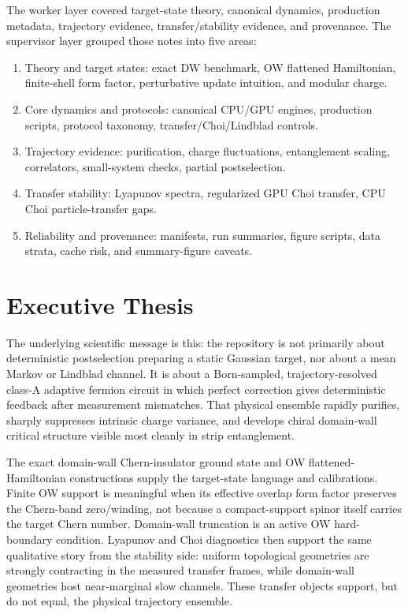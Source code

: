 \documentclass[aps,prb,onecolumn,nofootinbib,superscriptaddress]{revtex4-2}
\begin{document}
The worker layer covered target-state theory, canonical dynamics, production metadata, trajectory evidence, transfer/stability evidence, and provenance.  The supervisor layer grouped those notes into five areas:
\begin{enumerate}
\item Theory and target states: exact DW benchmark, OW flattened Hamiltonian, finite-shell form factor, perturbative update intuition, and modular charge.
\item Core dynamics and protocols: canonical CPU/GPU engines, production scripts, protocol taxonomy, transfer/Choi/Lindblad controls.
\item Trajectory evidence: purification, charge fluctuations, entanglement scaling, correlators, small-system checks, partial postselection.
\item Transfer stability: Lyapunov spectra, regularized GPU Choi transfer, CPU Choi particle-transfer gaps.
\item Reliability and provenance: manifests, run summaries, figure scripts, data strata, cache risk, and summary-figure caveats.
\end{enumerate}

\section{Executive Thesis}

The underlying scientific message is this: the repository is not primarily about deterministic postselection preparing a static Gaussian target, nor about a mean Markov or Lindblad channel.  It is about a Born-sampled, trajectory-resolved class-A adaptive fermion circuit in which perfect correction gives deterministic feedback after measurement mismatches.  That physical ensemble rapidly purifies, sharply suppresses intrinsic charge variance, and develops chiral domain-wall critical structure visible most cleanly in strip entanglement.

The exact domain-wall Chern-insulator ground state and OW flattened-Hamiltonian constructions supply the target-state language and calibrations.  Finite OW support is meaningful when its effective overlap form factor preserves the Chern-band zero/winding, not because a compact-support spinor itself carries the target Chern number.  Domain-wall truncation is an active OW hard-boundary condition.  Lyapunov and Choi diagnostics then support the same qualitative story from the stability side: uniform topological geometries are strongly contracting in the measured transfer frames, while domain-wall geometries host near-marginal slow channels.  These transfer objects support, but do not equal, the physical trajectory ensemble.
\end{document}
